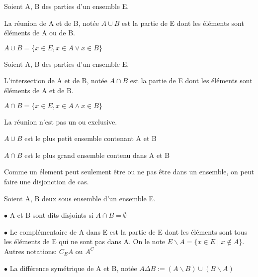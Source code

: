 \documentclass[a4paper, 12pt]{article}
\begin{document}
\begin{definition}
    Soient A, B des parties d'un ensemble E.

    La réunion de A et de B, notée $A \cup B$ est la partie de E dont les éléments sont éléments de A ou de B.

    $A \cup B = \{x \in E, x \in A \lor x \in B\}$
\end{definition}

\begin{definition}
    Soient A, B des parties d'un ensemble E.

    L'intersection de A et de B, notée $A \cap B$ est la partie de E dont les éléments sont éléments de A et de B.

    $A \cap B = \{x \in E, x \in A \land x \in B\}$
\end{definition}

\begin{remark}
    La réunion n'est pas un ou exclusive.
\end{remark}

\begin{remark}
    $A \cup B$ est le plus petit ensemble contenant A et B
\end{remark}

\begin{remark}
    $A \cap B$ est le plus grand ensemble contenu dans A et B
\end{remark}

\begin{remark}
    Comme un élement peut seulement être ou ne pas être dans un ensemble, on peut faire une disjonction de cas.
\end{remark}

\begin{definition}
    Soient A, B deux sous ensemble d'un ensemble E.

    \item $\bullet$ A et B sont dits disjoints si $A \cap B = \emptyset$
    \item $\bullet$ Le complémentaire de A dans E est la partie de E dont les éléments sont tous les éléments de E qui ne sont pas dans A.
    On le note $E\backslash A = \{x \in E \mid x \notin A\}$. Autres notations: $C_E A$ ou $A^C$
    \item $\bullet$ La différence symétrique de A et B, notée $A \Delta B := (A \backslash B) \cup (B \backslash A)$
\end{definition}

\end{document}
